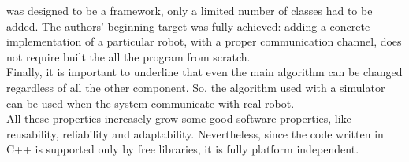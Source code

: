 was designed to be a framework, only a limited number of classes
had to be added. The authors' beginning target was fully achieved:
adding a concrete implementation of a particular robot, with a
proper communication channel, does not require built the all
the program from scratch.
\\
Finally, it is important to underline that even the main algorithm
can be changed regardless of all the other component. So, the
algorithm used with a simulator can be used when the system
communicate with real robot.
\\
All these properties increasely grow some good software properties,
like reusability, reliability and adaptability. Nevertheless,
since the code written in C++ is supported only by free libraries, it
is fully platform independent.
